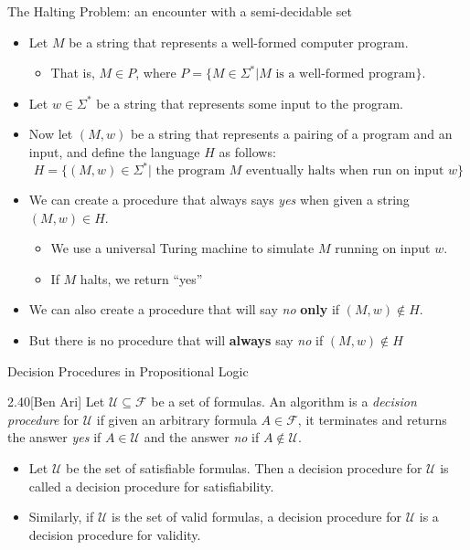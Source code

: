 \documentclass[style=sailor,size=12pt]{powerdot}
\begin{document}
\begin{wideslide}[bm=,toc=]{The Halting Problem: an encounter with a 
  semi-decidable set}
\begin{itemize}
\item<1-> Let $M$ be a string that represents a well-formed computer program.
\begin{itemize}
\item<2-> That is, $M \in P$, where $P = \{M \in \Sigma^* | M \text{ is a well-formed 
  program}\}$.
\end{itemize}
\item<3-> Let $w \in \Sigma^*$ be a string that represents some input to the program.
\item<4-> Now let $(M,w)$ be a string that represents a pairing of a program and an
input, and define the language $H$ as follows: \pause[4]
\[H = \{(M,w) \in \Sigma^* | \text{ the program } M
\text{ eventually halts when run on input } w\}\]
\vspace{-5mm}
\item<6-> We can create a procedure that always says \emph{yes} when given a
string $(M,w) \in H$. 
\begin{itemize}
\item<7-> We use a universal Turing machine to simulate $M$ running on input $w$.
\item<8-> If $M$ halts, we return ``yes''
\end{itemize}
\item<9-> We can also create a procedure that will say \emph{no} \textbf{only} if $(M,w) \notin H$.
\item<10-> But there is no procedure that will \textbf{always} say \emph{no} if $(M,w) \notin H$
\end{itemize}
\end{wideslide}

\begin{wideslide}[bm=,toc=]{Decision Procedures in Propositional Logic}
\begin{defn}{2.40}[Ben Ari]
Let $\mathcal{U} \subseteq \mathcal{F}$ be a set of formulas. An algorithm
is a \emph{decision procedure} for $\mathcal{U}$ if given an arbitrary formula
$A \in \mathcal{F}$, it terminates and returns the answer \emph{yes} if
$A \in \mathcal{U}$ and the answer \emph{no} if $A \notin \mathcal{U}$.
\end{defn}
\begin{itemize}
\item Let $\mathcal{U}$ be the set of satisfiable formulas. Then a decision
procedure for $\mathcal{U}$ is called a decision procedure for satisfiability.
\item Similarly, if $\mathcal{U}$ is the set of valid formulas, a decision
procedure for $\mathcal{U}$ is a decision procedure for validity. 
\end{itemize} 
\end{wideslide}
\end{document}
